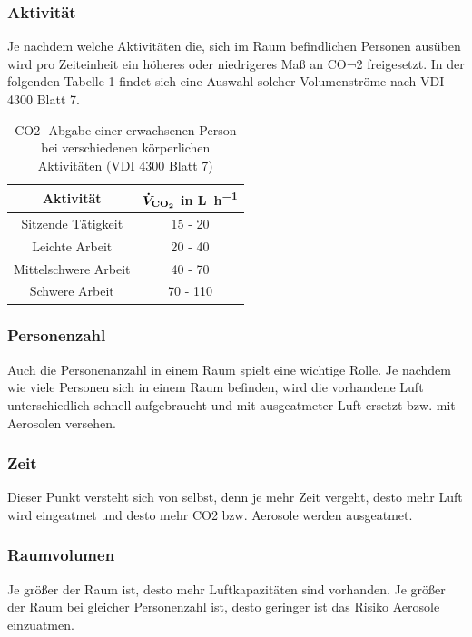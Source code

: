 \subsubsection*{Aktivität}
Je nachdem welche Aktivitäten die, sich im Raum befindlichen Personen ausüben wird pro Zeiteinheit ein höheres oder niedrigeres Maß an CO¬2 freigesetzt. In der folgenden Tabelle 1 findet sich eine Auswahl solcher Volumenströme nach VDI 4300 Blatt 7.

\begin{table}[h!]
	\renewcommand*{\arraystretch}{1.2}
	\centering
	\caption{CO2- Abgabe einer erwachsenen Person bei verschiedenen körperlichen Aktivitäten (VDI 4300 Blatt 7)}
	\label{tab:aktivitaeten}
		\begin{tabulary}{1.0\textwidth}{C|C}
			\hline
			\textbf{Aktivität} 	& \textbf{$\boldmath \dot{V}_{\ce{CO2}}$ in \si{\liter \per \hour}}\\
			\hline
			Sitzende Tätigkeit 	& 15 - 20 \\
			Leichte Arbeit			& 20 - 40 \\
			Mittelschwere Arbeit & 40 - 70 \\
			Schwere Arbeit 	& 70 - 110\\
			\hline			
		\end{tabulary}
\end{table}
\FloatBarrier
\vspace*{-5mm}
\subsubsection*{Personenzahl}
Auch die Personenanzahl in einem Raum spielt eine wichtige Rolle. Je nachdem wie viele Personen sich in einem Raum befinden, wird die vorhandene Luft unterschiedlich schnell aufgebraucht und mit ausgeatmeter Luft ersetzt bzw. mit Aerosolen versehen.

\subsubsection*{Zeit}
Dieser Punkt versteht sich von selbst, denn je mehr Zeit vergeht, desto mehr Luft wird eingeatmet und desto mehr CO2 bzw. Aerosole werden ausgeatmet.

\subsubsection*{Raumvolumen}
Je größer der Raum ist, desto mehr Luftkapazitäten sind vorhanden. Je größer der Raum bei gleicher Personenzahl ist, desto geringer ist das Risiko Aerosole einzuatmen.


